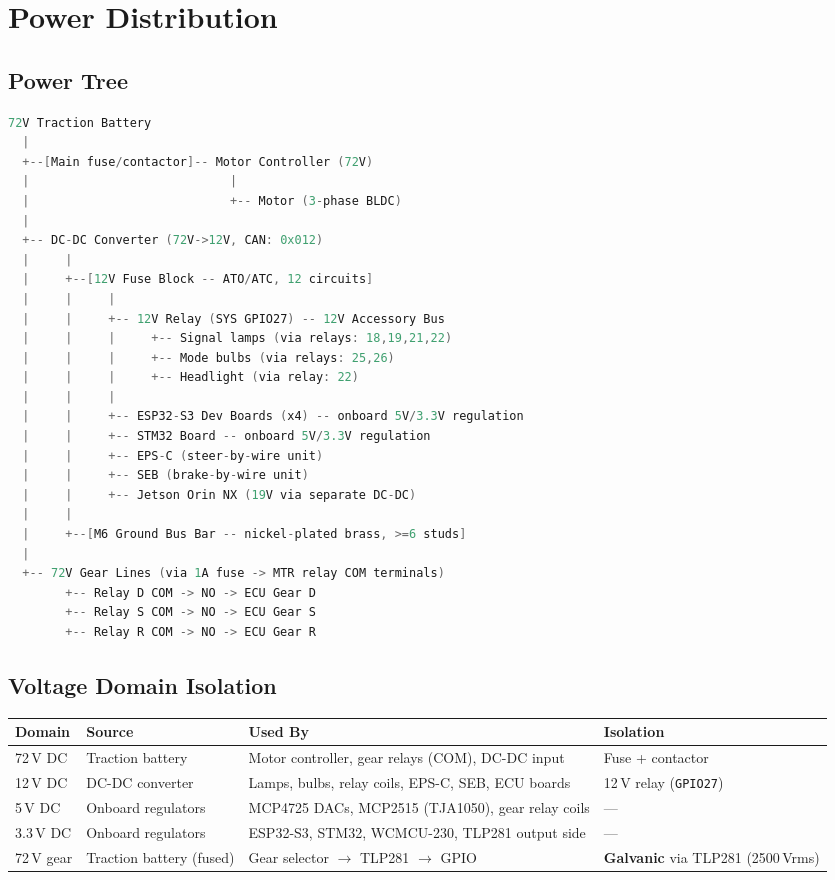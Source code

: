 \documentclass[12pt,a4paper,oneside]{report}
\newcommand{\gpio}[1]{\texttt{GPIO#1}}
\begin{document}

\chapter{Power Distribution}

\section{Power Tree}

\begin{lstlisting}[language=C, caption={Power distribution from 72\,V battery to all loads.}]
72V Traction Battery
  |
  +--[Main fuse/contactor]-- Motor Controller (72V)
  |                            |
  |                            +-- Motor (3-phase BLDC)
  |
  +-- DC-DC Converter (72V->12V, CAN: 0x012)
  |     |
  |     +--[12V Fuse Block -- ATO/ATC, 12 circuits]
  |     |     |
  |     |     +-- 12V Relay (SYS GPIO27) -- 12V Accessory Bus
  |     |     |     +-- Signal lamps (via relays: 18,19,21,22)
  |     |     |     +-- Mode bulbs (via relays: 25,26)
  |     |     |     +-- Headlight (via relay: 22)
  |     |     |
  |     |     +-- ESP32-S3 Dev Boards (x4) -- onboard 5V/3.3V regulation
  |     |     +-- STM32 Board -- onboard 5V/3.3V regulation
  |     |     +-- EPS-C (steer-by-wire unit)
  |     |     +-- SEB (brake-by-wire unit)
  |     |     +-- Jetson Orin NX (19V via separate DC-DC)
  |     |
  |     +--[M6 Ground Bus Bar -- nickel-plated brass, >=6 studs]
  |
  +-- 72V Gear Lines (via 1A fuse -> MTR relay COM terminals)
        +-- Relay D COM -> NO -> ECU Gear D
        +-- Relay S COM -> NO -> ECU Gear S
        +-- Relay R COM -> NO -> ECU Gear R
\end{lstlisting}

\section{Voltage Domain Isolation}

\begin{center}
\begin{tabular}{llll}
\toprule
\textbf{Domain} & \textbf{Source} & \textbf{Used By} & \textbf{Isolation} \\
\midrule
72\,V DC   & Traction battery & Motor controller, gear relays (COM), DC-DC input & Fuse + contactor \\
12\,V DC   & DC-DC converter  & Lamps, bulbs, relay coils, EPS-C, SEB, ECU boards & 12\,V relay (\gpio{27}) \\
5\,V DC    & Onboard regulators & MCP4725 DACs, MCP2515 (TJA1050), gear relay coils & --- \\
3.3\,V DC  & Onboard regulators & ESP32-S3, STM32, WCMCU-230, TLP281 output side & --- \\
72\,V gear & Traction battery (fused) & Gear selector $\rightarrow$ TLP281 $\rightarrow$ GPIO & \textbf{Galvanic} via TLP281 (2500\,Vrms) \\
\bottomrule
\end{tabular}
\end{center}
\end{document}
